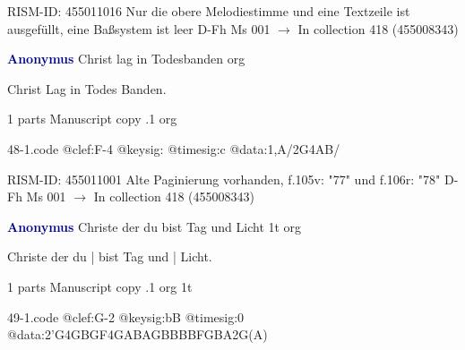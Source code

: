 \documentclass[twocolumn]{book}
\begin{document}
\newline RISM-ID: 455011016
\newline Nur die obere Melodiestimme und eine Textzeile ist ausgefüllt, eine Baßsystem ist leer
\newline D-Fh  Ms 001
\newline $\rightarrow$ In collection 418 (455008343)

\newline \par \vspace{7pt} \textcolor{darkblue}{\textbf{Anonymus  }}
\newline Christ lag in Todesbanden    
\newline org
\newline \begin{itshape}[f.105v, heading:] Christ Lag in Todes Banden.\end{itshape} 
\newline \textcolor{darkblue}{}  1 parts  
\newline Manuscript copy
.1  org  
\begin{filecontents*}{48-1.code}
@clef:F-4
@keysig:
@timesig:c
@data:1,A/2G4AB/%
\end{filecontents*}
\newline
%

\newline RISM-ID: 455011001
\newline Alte Paginierung vorhanden, f.105v: "77" und f.106r: "78"
\newline D-Fh  Ms 001
\newline $\rightarrow$ In collection 418 (455008343)

\newline \par \vspace{7pt} \textcolor{darkblue}{\textbf{Anonymus  }}
\newline Christe der du bist Tag und Licht  1t  
\newline org
\newline \begin{itshape}[f.31v, at left:] Christe der du | bist Tag und | Licht.\end{itshape} 
\newline \textcolor{darkblue}{}  1 parts  
\newline Manuscript copy
.1  org  1t  
\begin{filecontents*}{49-1.code}
@clef:G-2
@keysig:bB
@timesig:0
@data:2'G4GBGF4GABAGBBBBFGBA2G(A)
\end{filecontents*}
\newline
%
\end{document}
